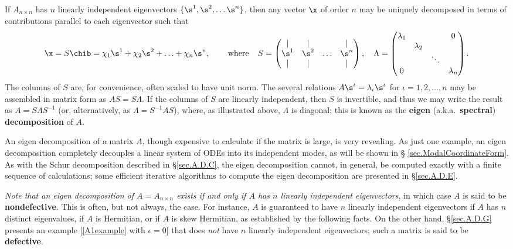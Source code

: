 If $A_{n\times n}$ has $n$ linearly independent eigenvectors
$\{\s^{1},\s^{2},\ldots \s^{n}\}$, then any vector $\x$ of order $n$
may be uniquely decomposed in terms of contributions parallel to each
eigenvector such that
\begin{equation*}
\x=S \chib = \chi_{1}\s^{1}+\chi_{2}\s^{2}+\ldots+\chi_{n}\s^{n}, \hskip0.3in \textrm{where} \hskip0.15in
S=\displaystyle \begin{pmatrix} | & | & & | \\ \s^1 & \s^2 & \ldots & \s^n \\  | & | & & | \end{pmatrix}, \quad
\Lambda=
       \begin{pmatrix} \lambda_1 &   &       & 0 \\
			 & \lambda_2 &       &   \\
			 &   &\ddots &   \\
		       0 &   &       & \lambda_n
		       \end{pmatrix}.
\end{equation*}
The columns of $S$ are, for convenience, often scaled to have unit
norm.  The several relations $A \s^\iota = \lambda_\iota \s^\iota$ for
$\iota = 1, 2, \ldots, n$ may be assembled in matrix form as $A S
= S \Lambda$.  If the columns of $S$ are linearly independent, then
$S$ is invertible, and thus we may write the result as $A = S \Lambda
S^{-1}$ (or, alternatively, as $\Lambda = S^{-1} A S$), where, as
illustrated above, $\Lambda$ is diagonal; this is known as the {\bf eigen} (a.k.a.~{\bf spectral}) {\bf decomposition} of $A$.  

An eigen decomposition of a matrix $A$,
though expensive to calculate if the matrix is large, is very revealing.
As just one example, an eigen decomposition completely decouples
a linear system of ODEs into its independent modes, as will be shown in \S
\ref{sec.ModalCoordinateForm}. As with the Schur decomposition
described in \S \ref{sec.A.D.C}, the eigen decomposition cannot, in
general, be computed exactly with a finite sequence of calculations;
some efficient iterative algorithms to compute the eigen decomposition
are presented in \S \ref{sec.A.D.E}.

{\it Note that an eigen decomposition of $A=A_{n\times n}$
exists if and only if $A$ has $n$ linearly independent eigenvectors}, in which case $A$ is said to be {\bf nondefective}.
This is often, but not always, the case.  For instance, $A$ is
guaranteed to have $n$ linearly independent eigenvectors if $A$ has
$n$ distinct eigenvalues, if $A$ is Hermitian, or if $A$ is skew
Hermitian, as established by the following facts.  On the other hand,
\S \ref{sec.A.D.G} presents an example [\eqref{A1example} with
$\epsilon=0$] that does {\it not} have $n$ linearly independent
eigenvectors; such a matrix is said to be {\bf defective}.

